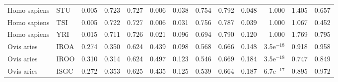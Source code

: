 \begin{longtable}{llrrrrrrrrrrr}
        Homo sapiens &                       STU &                              0.005 &                               0.723 &                 0.727 &                 0.006 &                              0.038 &                               0.754 &                 0.792 &                 0.048 &        1.000 &  1.405 &  0.657 \\
        Homo sapiens &                       TSI &                              0.005 &                               0.722 &                 0.727 &                 0.006 &                              0.031 &                               0.756 &                 0.787 &                 0.039 &        1.000 &  1.067 &  0.452 \\
        Homo sapiens &                       YRI &                              0.015 &                               0.711 &                 0.726 &                 0.021 &                              0.096 &                               0.694 &                 0.790 &                 0.120 &        1.000 &  1.769 &  0.795 \\
          Ovis aries &                      IROA &                              0.274 &                               0.350 &                 0.624 &                 0.439 &                              0.098 &                               0.568 &                 0.666 &                 0.148 & 3.5e$^{-18}$ &  0.918 &  0.958 \\
          Ovis aries &                      IROO &                              0.310 &                               0.314 &                 0.624 &                 0.497 &                              0.123 &                               0.546 &                 0.669 &                 0.184 & 3.5e$^{-18}$ &  0.747 &  0.849 \\
          Ovis aries &                      ISGC &                              0.272 &                               0.353 &                 0.625 &                 0.435 &                              0.125 &                               0.539 &                 0.664 &                 0.187 & 6.7e$^{-17}$ &  0.895 &  0.972 \\
\end{longtable}
\newpage